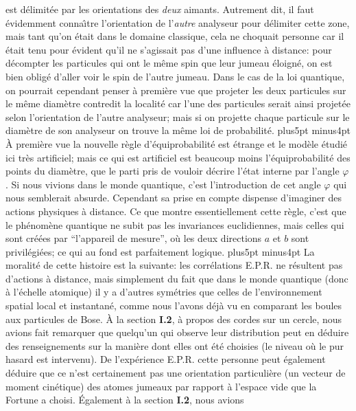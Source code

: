 est d\'elimit\'ee par les orientations des {\it deux} aimants. Autrement dit, 
il faut \'evidemment conna\^\i tre l'orientation de l'{\it autre} analyseur 
pour d\'elimiter cette zone, mais tant qu'on \'etait dans le domaine 
classique, cela ne choquait personne car il \'etait tenu pour \'evident 
qu'il ne s'agissait pas d'une influence \`a distance: pour d\'ecompter les  
particules qui ont le  m\^eme spin que leur jumeau \'eloign\'e, on est bien   
oblig\'e d'aller voir le spin de l'autre jumeau. Dans le cas de la loi 
quantique, on pourrait cependant penser \`a  premi\`ere vue que projeter 
les deux particules sur le m\^eme diam\`etre  contredit la localit\'e car 
l'une des particules serait ainsi projet\'ee selon l'orientation de l'autre 
analyseur; mais si  on projette chaque particule sur le diam\`etre de son 
analyseur on trouve la m\^eme  loi de  probabilit\'e.  
\vskip6pt plus5pt minus4pt 
\`A  premi\`ere vue la nouvelle r\`egle d'\'equiprobabilit\'e est 
\'etrange  et le mod\`ele \'etudi\'e ici tr\`es artificiel;  mais ce qui est 
artificiel est beaucoup moins  l'\'equiprobabilit\'e des  points  du
diam\`etre, que le parti pris de vouloir d\'ecrire l'\'etat interne par 
l'angle $\varphi$. Si nous vivions dans le monde quantique, c'est
l'introduction de cet angle $\varphi$ qui nous semblerait absurde.
Cependant sa prise en compte dispense d'imaginer des actions physiques
\`a  distance. Ce que montre essentiellement cette r\`egle, c'est que le
ph\'enom\`ene quantique ne subit pas les invariances euclidiennes, mais
celles qui sont cr\'e\'ees par ``l'appareil de mesure'', o\`u les deux
directions $a$ et $b$ sont privil\'egi\'ees; ce qui au fond est 
parfaitement logique.
\vskip6pt plus5pt minus4pt 
La moralit\'e de cette histoire est la suivante: les corr\'elations E.P.R.  
ne r\'esultent pas d'actions \`a distance, mais simplement du fait que 
dans le monde quantique (donc \`a l'\'echelle atomique) il y a d'autres 
sym\'etries que celles de l'environnement spatial local et instantan\'e,
comme nous l'avons d\'ej\`a vu en comparant les boules aux particules 
de Bose. \`A  la  section {\bf I.2}, \`a propos des cordes sur un cercle,
 nous avions fait remarquer que quelqu'un qui observe leur distribution
peut en d\'eduire des  renseignements sur la mani\`ere dont elles ont
\'et\'e choisies (le niveau o\`u le pur hasard est intervenu). De
l'exp\'erience E.P.R. cette personne peut \'egalement d\'eduire que ce
n'est certainement pas une orientation particuli\`ere (un vecteur de
moment cin\'etique) des atomes jumeaux par rapport  \`a l'espace vide
que la Fortune a choisi. \'Egalement \`a la section  {\bf I.2}, nous avions
